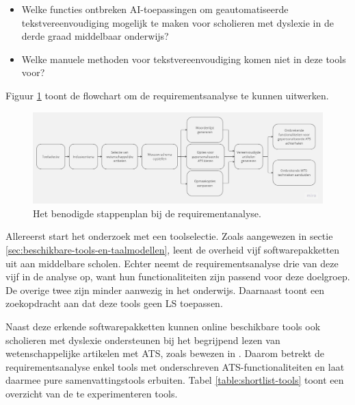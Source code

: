 \begin{itemize}
	\item Welke functies ontbreken AI-toepassingen om geautomatiseerde tekstvereenvoudiging mogelijk te maken voor scholieren met dyslexie in de derde graad middelbaar onderwijs?
	\item Welke manuele methoden voor tekstvereenvoudiging komen niet in deze tools voor?
\end{itemize}

Figuur \ref{img:flowchart-requirementsanalyse} toont de flowchart om de requirementsanalyse te kunnen uitwerken.

\begin{figure}[H]
	\includegraphics[width=\linewidth]{img/flowchart-requirementsanalyse.jpg}
	\caption{Het benodigde stappenplan bij de requirementanalyse.}
	\label{img:flowchart-requirementsanalyse}
\end{figure}

Allereerst start het onderzoek met een toolselectie. Zoals aangewezen in sectie \ref{sec:beschikbare-tools-en-taalmodellen}, leent de overheid vijf softwarepakketten uit aan middelbare scholen. Echter neemt de requirementsanalyse drie van deze vijf in de analyse op, want hun functionaliteiten zijn passend voor deze doelgroep. De overige twee zijn minder aanwezig in het onderwijs. Daarnaast toont een zoekopdracht aan dat deze tools geen LS toepassen. 

Naast deze erkende softwarepakketten kunnen online beschikbare tools ook scholieren met dyslexie ondersteunen bij het begrijpend lezen van wetenschappelijke artikelen met ATS, zoals bewezen in \textcite{Bingel2018}. Daarom betrekt de requirementsanalyse enkel tools met onderschreven ATS-functionaliteiten en laat daarmee pure samenvattingstools erbuiten. Tabel \ref{table:shortlist-tools} toont een overzicht van de te experimenteren tools.


